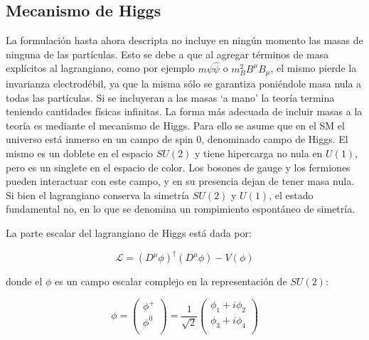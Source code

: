 \subsection{Mecanismo de Higgs}

La formulación hasta ahora descripta no incluye en ningún momento las masas de ninguna de las partículas. Esto se debe a que al agregar términos de masa explícitos al lagrangiano, como por ejemplo $m\psi\hat{\psi}$ o $m_B^2 B^{\mu}B_{\mu}$, el mismo pierde la invarianza electrodébil, ya que la misma sólo se garantiza poniéndole masa nula a todas las partículas. Si se incluyeran a las masas `a mano' la teoría termina teniendo cantidades físicas infinitas. 
La forma más adecuada de incluir masas a la teoría
es mediante el mecanismo de Higgs. Para ello se asume que en el SM el universo está inmerso en un campo de spin 0, denominado campo de Higgs. El mismo es un doblete en el espacio $SU(2)$ y tiene hipercarga no nula en $U(1)$, pero es un singlete en el espacio de color. 
Los bosones de gauge y los fermiones pueden interactuar con este campo, y en su presencia dejan de tener masa nula. Si bien el lagrangiano conserva la simetría $SU(2)$ y $U(1)$, el estado fundamental no, en lo que se denomina un rompimiento espontáneo de simetría.

La parte escalar del lagrangiano de Higgs está dada por:

\begin{equation}
\mathcal{L} = (D^{\mu}\phi)^{\dagger}(D^{\mu}\phi) - V(\phi)
\end{equation}

\noindent
donde el $\phi$ es un campo escalar complejo en la representación de $SU(2)$:

\begin{equation}
	\phi = 
	\begin{pmatrix}
	\phi^{+} \\
	\phi^{0} \\
	\end{pmatrix} = \frac{1}{\sqrt{2}}
	\begin{pmatrix}
	\phi_{1} + i\phi_{2} \\
	\phi_{3} + i\phi_{4} \\
	\end{pmatrix}
\end{equation}

